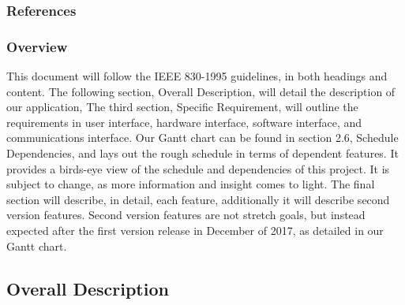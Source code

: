 \documentclass[onecolumn, draftclsnofoot,10pt, compsoc]{IEEEtran}
\begin{document}
\subsubsection{References}

\subsubsection{Overview}
This document will follow the IEEE 830-1995 guidelines, in both headings and content.
The following section, Overall Description, will detail the description of our application,
The third section, Specific Requirement, will outline the requirements in user interface, hardware interface, software interface, and communications interface.
Our Gantt chart can be found in section 2.6, Schedule Dependencies, and lays out the rough schedule in terms of dependent features.
It provides a birds-eye view of the schedule and dependencies of this project.
It is subject to change, as more information and insight comes to light.
The final section will describe, in detail, each feature, additionally it will describe second version features.
Second version features are not stretch goals, but instead expected after the first version release in December of 2017, as detailed in our Gantt chart.

\subsection{Overall Description}
\end{document}
